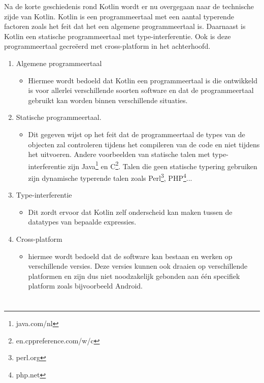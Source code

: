Na de korte geschiedenis rond Kotlin wordt er nu overgegaan naar de technische zijde van Kotlin. Kotlin is een programmeertaal met een aantal typerende factoren zoals het feit dat het een algemene programmeertaal is. Daarnaast is Kotlin een statische programmeertaal met type-interferentie. Ook is deze programmeertaal gecreëerd met cross-platform in het achterhoofd.\autocite{Oliveira2020}

\begin{enumerate}
    \item Algemene programmeertaal
    \begin{itemize}
        \item Hiermee wordt bedoeld dat Kotlin een programmeertaal is die ontwikkeld is voor allerlei verschillende soorten software en dat de programmeertaal gebruikt kan worden binnen verschillende situaties.\autocite{Skeen2018}
    \end{itemize}
    \item Statische programmeertaal. 
    \begin{itemize}
        \item Dit gegeven wijst op het feit dat de programmeertaal de types van de objecten zal controleren tijdens het compileren van de code en niet tijdens het uitvoeren. Andere voorbeelden van statische talen met type-interferentie zijn Java\footnote{java.com/nl} en C\footnote{en.cppreference.com/w/c}. Talen die geen statische typering gebruiken zijn dynamische typerende talen zoals Perl\footnote{perl.org}, PHP\footnote{php.net}... 
    \end{itemize}
    \item Type-interferentie
    \begin{itemize}
        \item Dit zordt ervoor dat Kotlin zelf onderscheid kan maken tussen de datatypes van bepaalde expressies.\autocite{Meijer2004}
    \end{itemize}
    \item Cross-platform
    \begin{itemize}
        \item hiermee wordt bedoeld dat de software kan bestaan en werken op verschillende versies. Deze versies kunnen ook draaien op verschillende platformen en zijn dus niet noodzakelijk gebonden aan één specifiek platform zoals bijvoorbeeld Android.\autocite{Bishop2006}
    \end{itemize}
\end{enumerate}

\section{}
\label{sec:SVZplatformen-ontwikkelingsvormen}


